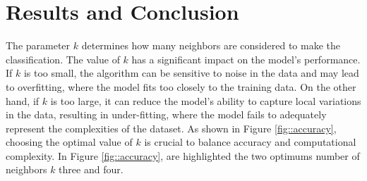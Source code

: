 \documentclass[9pt,technote]{IEEEtran}
\begin{document}
\section{Results and Conclusion}
The parameter $k$ determines how many neighbors are considered to make the classification. The value of $k$ has a significant impact on the model's performance. If $k$ is too small, the algorithm can be sensitive to noise in the data and may lead to overfitting, where the model fits too closely to the training data. On the other hand, if $k$ is too large, it can reduce the model's ability to capture local variations in the data, resulting in under-fitting, where the model fails to adequately represent the complexities of the dataset. As shown in Figure \ref{fig::accuracy}, choosing the optimal value of $k$ is crucial to balance accuracy and computational complexity.
In Figure \ref{fig::accuracy}, are highlighted the two optimums number of neighbors $k$ three and four.


\end{document}
